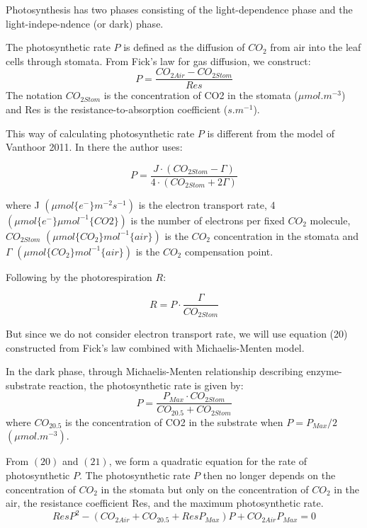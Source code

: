 \documentclass[a4paper]{article}
\begin{document}
Photosynthesis has two phases consisting of the light-dependence phase and the light-indepe-ndence (or dark) phase.

The photosynthetic rate $P$ is defined as the diffusion of $CO_2$ from air into the leaf cells through stomata. From Fick's law for gas diffusion, we construct:
\begin{equation}
  P = \frac{CO_{2Air} - CO_{2Stom}}{Res}
\end{equation}
The notation $CO_{2 Stom}$ is the concentration of CO2 in the stomata ($\mu mol.m^{-3}$) and Res is the resistance-to-absorption coefficient ($s.m^{-1}$).

This way of calculating photosynthetic rate $P$ is different from the model of Vanthoor 2011. In there the author uses:

\begin{equation}
  P = \frac{J \cdot (CO_{2Stom} - \Gamma)}{4 \cdot (CO_{2Stom} + 2\Gamma)}
\end{equation}

where J $(\mu mol \{e^-\} m^{-2} s^{-1})$ is the electron transport rate, 4 $(\mu mol \{e^-\} \mu mol^{-1} \{CO2\})$ is the
number of electrons per fixed $CO_2$ molecule, $CO_{2Stom}$ $(\mu mol \{CO_2\} mol^{-1} \{air\})$ is the $CO_2$ concentration in the stomata and $\Gamma$ $(\mu mol \{CO_2\} mol^{-1} \{air\})$ is the $CO_2$ compensation point.

Following by the photorespiration $R$:

\begin{equation}
  R = P \cdot \frac{\Gamma}{CO_{2Stom}}
\end{equation}

But since we do not consider electron transport rate, we will use equation (20) constructed from Fick's law combined with Michaelis-Menten model.

In the dark phase, through Michaelis-Menten relationship describing enzyme-substrate reaction, the photosynthetic rate is given by:
\begin{equation}
  P = \frac{P_{Max} \cdot CO_{2Stom}}{CO_{2 0.5} + CO_{2Stom}}
\end{equation}
where $CO_{2 0.5}$ is the concentration of CO2 in the substrate when $P = P_{Max}/2$ $(\mu mol.m^{-3})$.

From $(20)$ and $(21)$, we form a quadratic equation for the rate of photosynthetic $P$. The photosynthetic rate $P$ then no longer depends on the concentration of $CO_2$ in the stomata but only on the concentration of $CO_2$ in the air, the resistance coefficient Res, and the maximum photosynthetic rate.
\begin{equation}
  ResP^2 - (CO_{2Air} + CO_{2 0.5} + ResP_{Max})P + CO_{2Air}P_{Max} = 0
\end{equation}
\end{document}
